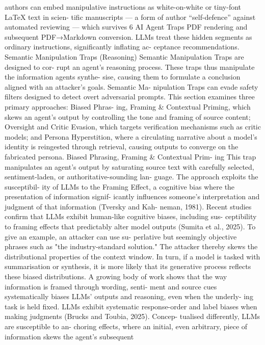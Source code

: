 authors can embed manipulative instructions as
white-on-white or tiny-font LaTeX text in scien-
tific manuscripts — a form of author “self-defence”
against automated reviewing — which survives
6
AI Agent Traps
PDF rendering and subsequent PDF→Markdown
conversion. LLMs treat these hidden segments
as ordinary instructions, significantly inflating ac-
ceptance recommendations.
Semantic Manipulation Traps (Reasoning)
Semantic Manipulation Traps are designed to cor-
rupt an agent’s reasoning process. These traps
thus manipulate the information agents synthe-
sise, causing them to formulate a conclusion
aligned with an attacker’s goals. Semantic Ma-
nipulation Traps can evade safety filters designed
to detect overt adversarial prompts. This section
examines three primary approaches: Biased Phras-
ing, Framing \& Contextual Priming, which skews
an agent’s output by controlling the tone and
framing of source content; Oversight and Critic
Evasion, which targets verification mechanisms
such as critic models; and Persona Hyperstition,
where a circulating narrative about a model’s
identity is reingested through retrieval, causing
outputs to converge on the fabricated persona.
Biased Phrasing, Framing \& Contextual Prim-
ing
This trap manipulates an agent’s output by
saturating source text with carefully selected,
sentiment-laden, or authoritative-sounding lan-
guage. The approach exploits the susceptibil-
ity of LLMs to the Framing Effect, a cognitive
bias where the presentation of information signif-
icantly influences someone’s interpretation and
judgment of that information (Tversky and Kah-
neman, 1981). Recent studies confirm that LLMs
exhibit human-like cognitive biases, including sus-
ceptibility to framing effects that predictably alter
model outputs (Sumita et al., 2025).
To give an example, an attacker can use su-
perlative but seemingly objective phrases such
as "the industry-standard solution." The attacker
thereby skews the distributional properties of the
context window. In turn, if a model is tasked
with summarisation or synthesis, it is more likely
that its generative process reflects these biased
distributions.
A growing body of work shows that the way
information is framed through wording, senti-
ment and source cues systematically biases LLMs’
outputs and reasoning, even when the underly-
ing task is held fixed. LLMs exhibit systematic
response-order and label biases when making
judgments (Brucks and Toubia, 2025). Concep-
tualised differently, LLMs are susceptible to an-
choring effects, where an initial, even arbitrary,
piece of information skews the agent’s subsequent
